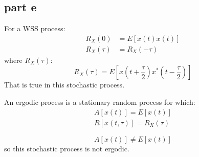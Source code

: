 \subsection{part e}
For a WSS process:
\begin{align*}
    R_X(0) &= E[x(t)x(t)]\\
    R_X(\tau) &= R_X(-\tau)
\end{align*}
where $R_X(\tau)$:
$$
R_X(\tau) = E\left[x(t+\dfrac{\tau}{2})x^*(t-\dfrac{\tau}{2})\right]
$$
That is true in this stochastic process.



An ergodic process is a stationary random process for which:
\begin{align*}
    A[x(t)] = E[x(t)]\\
    R[x(t, \tau)] = R_X(\tau)
\end{align*}

$$
A[x(t)] \not= E[x(t)]
$$
so this stochastic process is not ergodic.